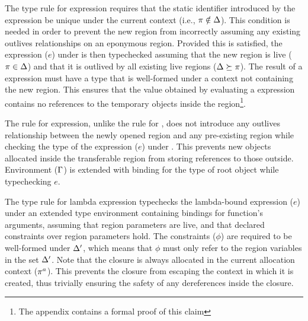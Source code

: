 The type rule for  expression requires that the static
identifier introduced by the expression be unique under the current
context (i.e., $\pi \notin \Delta$). This condition is needed in
order to prevent the new region from incorrectly assuming any existing
outlives relationships on an eponymous region. Provided this is
satisfied, the expression ($e$) under  is then
typechecked assuming that the new region is live ($\pi \in \Delta$)
and that it is outlived by all existing live regions ($\Delta
\succeq \pi$). The result of a  expression must have a
type that is well-formed under a context not containing the new
region. This ensures that the value obtained by evaluating a
 expression contains no references to the temporary
objects inside the region\footnote{The appendix contains a formal
proof of this claim}.

The rule for  expression, unlike the rule for ,
does not introduce any outlives relationship between the newly opened
region and any pre-existing region while checking the type of the
expression ($e$) under . This prevents new objects allocated
inside the transferable region from storing references to those
outside.  Environment ($\Gamma$) is extended with binding for the type
of root object while typechecking $e$. 

The type rule for lambda expression typechecks
the lambda-bound expression ($e$) under an extended type environment
containing bindings for function's arguments, assuming that region
parameters are live, and that declared constraints over region
parameters hold. The constraints ($\phi$) are required to be
well-formed under $\Delta'$, which means that $\phi$ must only refer
to the region variables in the set $\Delta'$. Note that the closure
is always allocated in the current allocation context ($\pi^a$). This
prevents the closure from escaping the context in which it is created,
thus trivially ensuring the safety of any dereferences inside the
closure.



